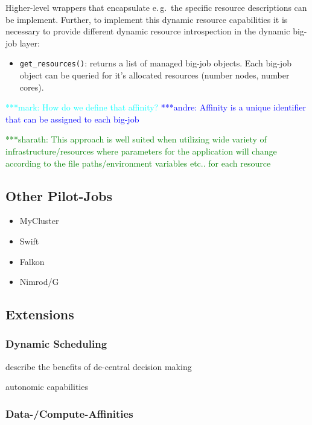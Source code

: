\documentclass[]{article}
\newcommand{\alnote}[1]{ {\textcolor{blue} { ***andre: #1 }}}
\newcommand{\smnote}[1]{ {\textcolor{green} { ***sharath: #1 }}}
\newcommand{\msnote}[1]{ {\textcolor{cyan} { ***mark: #1 }}}
\newcommand{\alnote}[1]{}
\newcommand{\smnote}[1]{}
\begin{document}
Higher-level wrappers that encapsulate e.\,g.\ the specific resource
descriptions can be implement. Further, to implement this dynamic resource
capabilities it is necessary to provide different dynamic resource introspection
in the dynamic big-job layer:
\begin{itemize}
    \item \texttt{get\_resources()}: returns a list of managed big-job objects.
     Each big-job object can be queried for it's allocated resources (number 
     nodes, number cores).
\end{itemize}



\msnote{How do we define that affinity?}\alnote{Affinity is a unique identifier 
that can be assigned to each big-job}

\smnote{This approach is well suited when utilizing wide variety of
infrastructure/resources where parameters for the application will change
according to the file paths/environment variables etc.. for each resource}

\subsection{Other Pilot-Jobs}

\begin{itemize}
    \item MyCluster
    \item Swift
    \item Falkon
    \item Nimrod/G
\end{itemize}


\subsection{Extensions}


\subsubsection{Dynamic Scheduling}

describe the benefits of de-central decision making 

autonomic capabilities


\subsubsection{Data-/Compute-Affinities}
\end{document}
